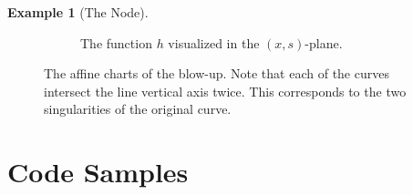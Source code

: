 \documentclass{article}
\theoremstyle{definition}
\newtheorem{example}{Example}
\begin{document}
\begin{example}[The Node]
\begin{figure}[h!]
\begin{subfigure}[t]{0.3\textwidth}
            \caption{The function $h$ visualized in the $(x, s)$-plane.}
        \end{subfigure}
        \caption{The affine charts of the blow-up. Note that each of the curves
        intersect the line vertical axis twice. This corresponds to the two
        singularities of the original curve.}
    \end{figure}
\end{example}

\appendix

\section{Code Samples}
\label{sec:code_samples}
\end{document}
